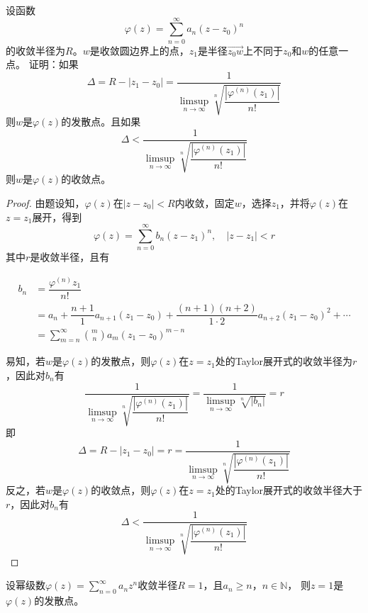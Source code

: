 \begin{lemma}\label{lemma:radius}

    设函数
    $$\varphi(z) = \sum\limits_{n = 0}^{\infty}{a_n (z - z_0)^n}$$
    的收敛半径为$R$。$w$是收敛圆边界上的点，$z_1$是半径$\vec{z_0w}$上不同于$z_0$和$w$的任意一点。
    证明：如果
    $$\Delta = R - |z_1 - z_0| = \dfrac{1}{\limsup\limits_{n \to \infty}{\sqrt[n]{\dfrac{|\varphi^{(n)}(z_1)|}{n!}}}}$$
    则$w$是$\varphi(z)$的发散点。且如果
    $$\Delta < \dfrac{1}{\limsup\limits_{n \to \infty}{\sqrt[n]{\dfrac{|\varphi^{(n)}(z_1)|}{n!}}}}$$
    则$w$是$\varphi(z)$的收敛点。

\end{lemma}

\begin{proof}

    由题设知，$\varphi(z)$在$|z - z_0| < R$内收敛，固定$w$，选择$z_1$，并将$\varphi(z)$在$z = z_1$展开，得到
    $$\varphi(z) = \sum\limits_{n = 0}^{\infty}{b_n (z - z_1)^n}, \quad |z - z_1| < r$$
    其中$r$是收敛半径，且有

    \begin{align*}
        b_n & = \dfrac{\varphi^{(n)}{z_1}}{n!} \\
        & = a_n + \dfrac{n + 1}{1}a_{n + 1}(z_1 - z_0) + \dfrac{(n + 1)(n + 2)}{1 \cdot 2}a_{n + 2}(z_1 - z_0)^2 + \cdots \\
        & = \sum\limits_{m = n}^{\infty}{\binom{m}{n}a_m(z_1 - z_0)^{m - n}}
    \end{align*}

    易知，若$w$是$\varphi(z)$的发散点，则$\varphi(z)$在$z = z_1$处的\textup{Taylor}展开式的收敛半径为$r$，因此对$b_n$有
    $$\dfrac{1}{\limsup\limits_{n \to \infty}{\sqrt[n]{\dfrac{|\varphi^{(n)}(z_1)|}{n!}}}} = \dfrac{1}{\limsup\limits_{n \to \infty}{\sqrt[n]{|b_n|}}} = r$$
    即
    $$\Delta = R - |z_1 - z_0| = r = \dfrac{1}{\limsup\limits_{n \to \infty}{\sqrt[n]{\dfrac{|\varphi^{(n)}(z_1)|}{n!}}}}$$
    反之，若$w$是$\varphi(z)$的收敛点，则$\varphi(z)$在$z = z_1$处的\textup{Taylor}展开式的收敛半径大于$r$，因此对$b_n$有
    $$\Delta < \dfrac{1}{\limsup\limits_{n \to \infty}{\sqrt[n]{\dfrac{|\varphi^{(n)}(z_1)|}{n!}}}}$$

\end{proof}

\begin{theorem}[Pringshajm定理]
    
    设幂级数$\varphi(z) = \sum\limits_{n = 0}^{\infty}{a_n z^n}$收敛半径$R = 1$，且$a_n \geq n$，$n \in \mathbb{N}$，
    则$z = 1$是$\varphi(z)$的发散点。

\end{theorem}

